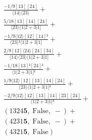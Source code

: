 \documentclass[varwidth, border=5pt]{standalone}
\begin{document}
\begin{my}
$\begin{gathered}
\scriptscriptstyle\frac{-1/9[13][24]}{⟨14⟩⟨23⟩} +\\
\scriptscriptstyle\frac{5/18[13][14][24]}{⟨23⟩⟨1|2+3|1]} +\\
\scriptscriptstyle\frac{-1/9⟨12⟩[12][14]²}{⟨23⟩²⟨1|2+3|1]} +\\
\scriptscriptstyle\frac{2/9[12]⟨24⟩[24][34]}{⟨14⟩⟨23⟩⟨1|2+3|1]} +\\
\scriptscriptstyle\frac{-1/18[13]²[24]²}{⟨1|2+3|1]²} +\\
\scriptscriptstyle\frac{1/9⟨12⟩[12][13][14][24]}{⟨23⟩⟨1|2+3|1]²} +\\
\scriptscriptstyle\frac{-2/9⟨12⟩[12][13][14][23][24]}{⟨1|2+3|1]³} +\\
\scriptscriptstyle(1324𝟓,\;\text{False},\;-) +\\
\scriptscriptstyle(4231𝟓,\;\text{False},\;-) +\\
\scriptscriptstyle(4321𝟓,\;\text{False}) \phantom{+}
\end{gathered}$
\end{my}
\end{document}
